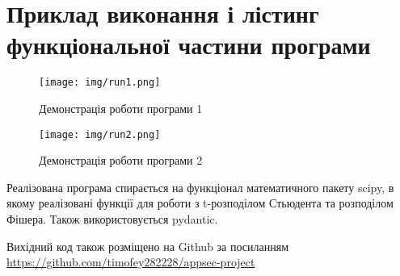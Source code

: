 \documentclass{dstu}
\begin{document}
\chapter{Приклад виконання і лістинг функціональної частини програми}

\begin{figure}[!htp]
	\centering
	\texttt{[image: img/run1.png]}
	\caption{Демонстрація роботи програми 1}
\end{figure}

\begin{figure}[!htp]
	\centering
	\texttt{[image: img/run2.png]}
	\caption{Демонстрація роботи програми 2}
\end{figure}

Реалізована програма спирається на функціонал математичного пакету scipy,
в якому реалізовані функції для роботи з t-розподілом Стьюдента та розподілом Фішера.
Також використовується pydantic.

Вихідний код також розміщено на Github за посиланням
\href{https://github.com/timofey282228/appsec-project}{https://github.com/timofey282228/appsec-project}

\inputminted{python}{../appsec_project/win_read_cli.py}
\inputminted{python}{../appsec_project/common_read.py}
\inputminted{python}{../appsec_project/model.py}
\inputminted{python}{../appsec_project/statutils.py}
\inputminted{python}{../appsec_project/storage.py}
\inputminted{python}{../appsec_project/__main__.py}
\end{document}
